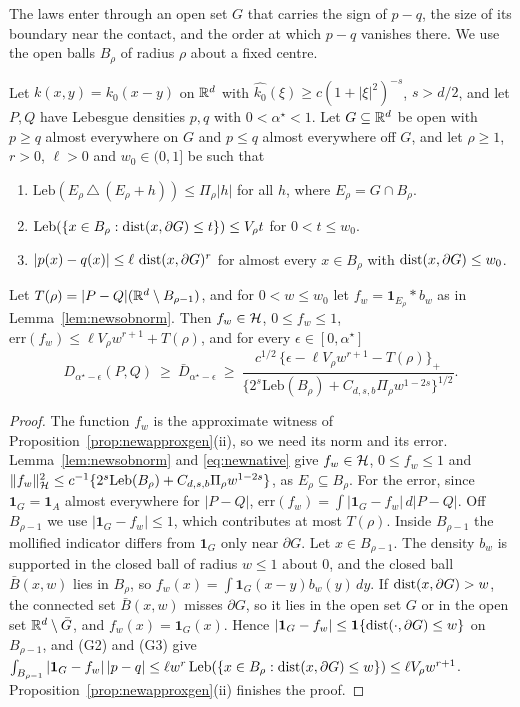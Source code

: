 The laws enter through an open set $G$ that carries the sign of $p-q$, the size of its boundary near the contact, and
the order at which $p-q$ vanishes there. We use the open balls $B_\rho$ of radius $\rho$ about a fixed centre.

\begin{theorem}
\label{thm:newsobolev}
Let $k(x,y)=k_0(x-y)$ on $\mathbb{R}^d$ with $\widehat{k_0}(\xi)\ge c(1+|\xi|^2)^{-s}$, $s>d/2$, and let $P,Q$ have Lebesgue
densities $p,q$ with $0<\alpha^\star<1$. Let $G\subseteq\mathbb{R}^d$ be open with $p\ge q$ almost everywhere on $G$ and $p\le q$
almost everywhere off $G$, and let $\rho\ge1$, $r>0$, $\ell>0$ and $w_0\in(0,1]$ be such that
\begin{enumerate}[label=(G\arabic*),leftmargin=*]
\item $\mathrm{Leb}(E_\rho\,\triangle\,(E_\rho+h))\le\Pi_\rho|h|$ for all $h$, where $E_\rho=G\cap B_\rho$.
\item $\mathrm{Leb}(\{x\in B_\rho:\operatorname{dist}(x,\partial G)\le t\})\le V_\rho t$ for $0<t\le w_0$.
\item $|p(x)-q(x)|\le\ell\,\operatorname{dist}(x,\partial G)^r$ for almost every $x\in B_\rho$ with $\operatorname{dist}(x,\partial G)\le w_0$.
\end{enumerate}
Let $T(\rho)=|P-Q|(\mathbb{R}^d\setminus B_{\rho-1})$, and for $0<w\le w_0$ let $f_w=\mathbf 1_{E_\rho}*b_w$ as in
Lemma~\ref{lem:newsobnorm}. Then $f_w\in\mathcal{H}$, $0\le f_w\le1$, $\mathrm{err}(f_w)\le\ell V_\rho w^{r+1}+T(\rho)$, and for every
$\epsilon\in[0,\alpha^\star]$
\[
D_{\alpha^\star-\epsilon}(P,Q)\ \ge\ \bar D_{\alpha^\star-\epsilon}\ \ge\ \frac{c^{1/2}\,\{\epsilon-\ell V_\rho w^{r+1}-T(\rho)\}_+}
{\{2^s\mathrm{Leb}(B_\rho)+C_{d,s,b}\Pi_\rho w^{1-2s}\}^{1/2}} .
\]
\end{theorem}

\begin{proof}
The function $f_w$ is the approximate witness of Proposition~\ref{prop:newapproxgen}(ii), so we need its norm and its
error. Lemma~\ref{lem:newsobnorm} and \eqref{eq:newnative} give $f_w\in\mathcal{H}$, $0\le f_w\le1$ and
$\|f_w\|_{\mathcal{H}}^2\le c^{-1}\{2^s\mathrm{Leb}(B_\rho)+C_{d,s,b}\Pi_\rho w^{1-2s}\}$, as $E_\rho\subseteq B_\rho$. For the error,
since $\mathbf 1_G=\mathbf 1_A$ almost everywhere
for $|P-Q|$, $\mathrm{err}(f_w)=\int|\mathbf 1_G-f_w|\,d|P-Q|$. Off $B_{\rho-1}$ we use $|\mathbf 1_G-f_w|\le1$, which contributes at
most $T(\rho)$. Inside $B_{\rho-1}$ the mollified indicator differs from $\mathbf 1_G$ only near $\partial G$. Let
$x\in B_{\rho-1}$. The density $b_w$ is supported in the closed ball of radius $w\le1$ about $0$, and the
closed ball $\bar B(x,w)$ lies in $B_\rho$, so $f_w(x)=\int\mathbf 1_G(x-y)b_w(y)\,dy$. If $\operatorname{dist}(x,\partial G)>w$, the connected
set $\bar B(x,w)$ misses $\partial G$, so it lies in the open set $G$ or in the open set $\mathbb{R}^d\setminus\bar G$, and
$f_w(x)=\mathbf 1_G(x)$. Hence $|\mathbf 1_G-f_w|\le\mathbf 1\{\operatorname{dist}(\cdot,\partial G)\le w\}$ on $B_{\rho-1}$, and (G2) and (G3) give
$\int_{B_{\rho-1}}|\mathbf 1_G-f_w|\,|p-q|\le\ell w^r\,\mathrm{Leb}(\{x\in B_\rho:\operatorname{dist}(x,\partial G)\le w\})\le\ell V_\rho w^{r+1}$.
Proposition~\ref{prop:newapproxgen}(ii) finishes the proof.
\end{proof}

